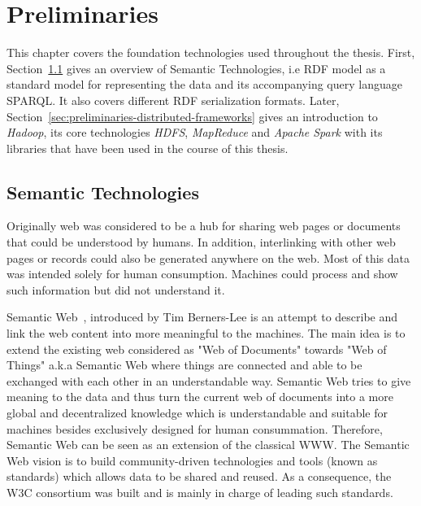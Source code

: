 \chapter{Preliminaries}
\label{chapter:preliminaries}
This chapter covers the foundation technologies used throughout the thesis.
First, Section~\ref{sec:preliminaries-semantic-technologies} gives an overview of Semantic Technologies, i.e \gls{RDF} model as a standard model for representing the data and its accompanying query language \gls{SPARQL}.
It also covers different \gls{RDF} serialization formats. 
Later, Section~\ref{sec:preliminaries-distributed-frameworks} gives an introduction to \textit{Hadoop}, its core technologies \textit{\gls{HDFS}}, \textit{MapReduce} and \textit{Apache Spark} with its libraries that have been used in the course of this thesis.

\section{Semantic Technologies}
\label{sec:preliminaries-semantic-technologies}
Originally web was considered to be a hub for sharing web pages or documents that could be understood by humans.
In addition, interlinking with other web pages or records could also be generated anywhere on the web. 
Most of this data was intended solely for human consumption.
Machines could process and show such information but did not understand it.

Semantic Web~\cite{bernerslee2001semantic}, introduced by Tim Berners-Lee is an attempt to describe and link the web content into more meaningful to the machines.
The main idea is to extend the existing web considered as "Web of Documents" towards "Web of Things" a.k.a Semantic Web where things are connected and able to be exchanged with each other in an understandable way.
Semantic Web tries to give meaning to the data and thus turn the current web of documents into a more global and decentralized knowledge which is understandable and suitable for machines besides exclusively designed for human consummation.
Therefore, Semantic Web can be seen as an extension of the classical \gls{WWW}.
The Semantic Web vision is to build community-driven technologies and tools (known as standards) which allows data to be shared and reused.
As a consequence, the \gls{W3C} consortium was built and is mainly in charge of leading such standards.


